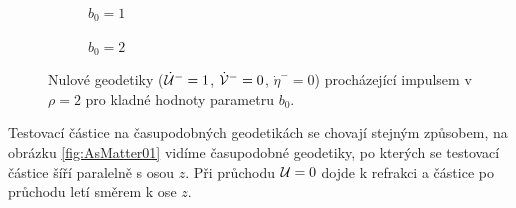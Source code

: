 \begin{figure}[ht]
    \centering
    \begin{subfigure}[b]{0.45\textwidth}
        \caption{$b_0 = 1$}
    \end{subfigure}
    \hfill
    \begin{subfigure}[b]{0.45\textwidth}
        \caption{$b_0 = 2$}
    \end{subfigure}
\caption{Nulové geodetiky ($\dot {\mathcal{U}}^-=1$, $\dot {\mathcal{V}}^-=0$, $\dot \eta^-=0$) procházející impulsem v $\rho=2$ pro kladné hodnoty parametru $b_0$.}
\label{fig:ASNullFyzikalnejsi}
\end{figure}

Testovací částice na časupodobných geodetikách se chovají stejným způsobem, na obrázku \ref{fig:AsMatter01} vidíme časupodobné geodetiky,
po kterých se testovací částice šíří paralelně s osou $z$. Při průchodu $\mathcal{U} = 0$ dojde k refrakci a částice po průchodu letí směrem k ose $z$.

